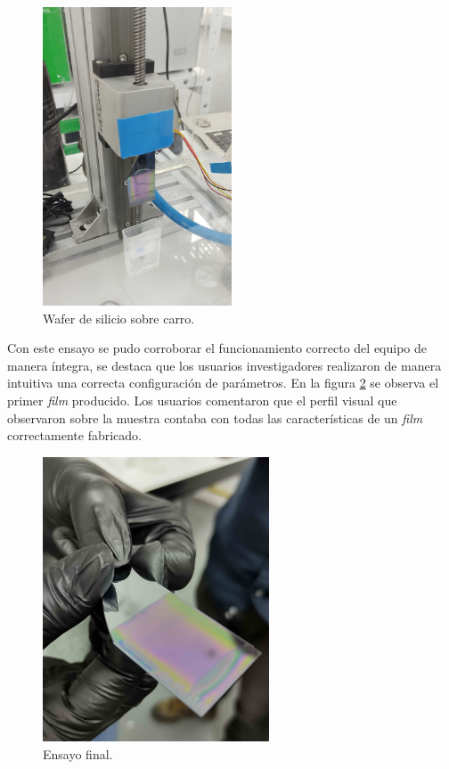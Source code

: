 \begin{figure}[h!]
\centering 
\includegraphics[width=0.5\textwidth]{./Figures/prueba_a.jpg}
\caption{Wafer de silicio sobre carro.}
\label{fig:equipo_laboratorio_a}
\end{figure}

Con este ensayo se pudo corroborar el funcionamiento correcto del equipo de manera íntegra, se destaca que los usuarios investigadores realizaron de manera intuitiva una correcta configuración de parámetros. En la figura \ref{fig:equipo_laboratorio_c} se observa el primer \textit{film} producido. Los usuarios comentaron que el perfil visual que observaron sobre la muestra contaba con todas las características de un \textit{film} correctamente fabricado.  

\begin{figure}[h!]
\centering 
\includegraphics[width=0.6\textwidth]{./Figures/prueba_c.jpg}
\caption{Ensayo final.}
\label{fig:equipo_laboratorio_c}
\end{figure}

